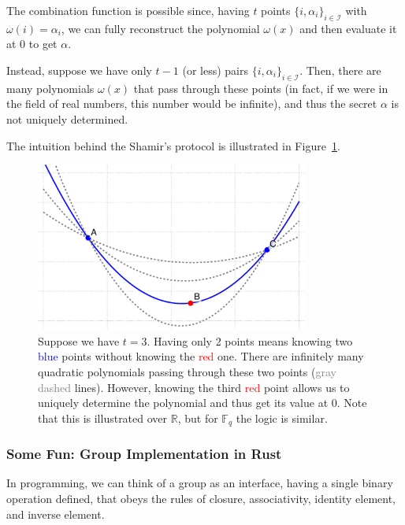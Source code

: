 \documentclass[../lecture-notes.tex]{subfiles}
\begin{document}
The combination function is possible since, having $t$ points $\{i,\alpha_i\}_{i \in \mathcal{I}}$ with $\omega(i) = \alpha_i$, we can fully reconstruct the polynomial $\omega(x)$ and then evaluate it at $0$ to get $\alpha$.

Instead, suppose we have only $t-1$ (or less) pairs $\{i,\alpha_i\}_{i \in \mathcal{I}}$. Then, there are many polynomials $\omega(x)$ that pass through these points (in fact, if we were in the field of real numbers, this number would be infinite), and thus the secret $\alpha$ is not uniquely determined.

The intuition behind the Shamir's protocol is illustrated in Figure~\ref{fig:shamir}.

\begin{figure}
    \centering
    \includegraphics[width=0.8\textwidth]{images/lecture_1/shamir_demo.pdf}
    \caption{Suppose we have $t=3$. Having only 2 points means knowing two \textcolor{blue}{blue} points without knowing the \textcolor{red}{red} one. There are infinitely many quadratic polynomials passing through these two points (\textcolor{gray}{gray dashed} lines). However, knowing the third \textcolor{red}{red} point allows us to uniquely determine the polynomial and thus get its value at $0$. Note that this is illustrated over $\mathbb{R}$, but for $\mathbb{F}_q$ the logic is similar.}
    \label{fig:shamir}
\end{figure}

\pagebreak

\subsubsection{Some Fun: Group Implementation in Rust}

In programming, we can think of a group as an interface, having a single binary operation defined, that obeys the rules of closure, associativity, identity element, and inverse element.
\end{document}
